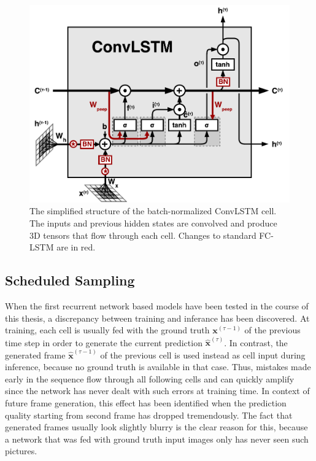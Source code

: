 \begin{figure}[htpb]
	\centering
	\includegraphics[width=0.7\linewidth]{figures/convlstm.pdf} 
	\caption[ConvLSTM Cell]{The simplified structure of the batch-normalized ConvLSTM cell. The inputs and previous hidden states are convolved and produce 3D tensors that flow through each cell. Changes to standard FC-LSTM are in red.} \label{fig:convlstm-cell}
\end{figure}


\subsection{Scheduled Sampling} \label{sec:sched_sample}


When the first recurrent network based models have been tested in the course of this thesis, a discrepancy between training and inferance has been discovered. At training, each cell is usually fed with the ground truth $\textbf{x}^{(\tau-1)}$ of the previous time step in order to generate the current prediction $\hat{\textbf{x}}^{(\tau)}$. In contrast, the generated frame $ \hat{\textbf{x}}^{(\tau-1)}$ of the previous cell is used instead as cell input during inference, because no ground truth is available in that case. Thus, mistakes made early in the sequence flow through all following cells and can quickly amplify since the network has never dealt with such errors at training time. In context of future frame generation, this effect has been identified when the prediction quality starting from second frame has dropped tremendously. The fact that generated frames usually look slightly blurry is the clear reason for this, because a network that was fed with ground truth input images only has never seen such pictures.

